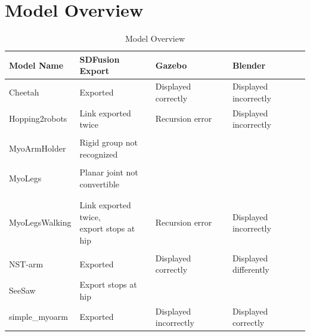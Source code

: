 \section{Model Overview}
\label{sec:over}
\begin{table}[h]
\hskip-4mm
\begin{tabular}{|l|l|l|l|}
\hline
\textbf{Model Name} & \textbf{SDFusion Export} & \textbf{Gazebo} & \textbf{Blender}\\ \hline
Cheetah & Exported & Displayed correctly & Displayed incorrectly\\\hline
Hopping2robots& Link exported twice& Recursion error & Displayed incorrectly\\\hline
&&&\\[-1em]
MyoArmHolder & \pbox{20cm}{Rigid group not\\recognized} & & \\ \hline
&&&\\[-1em]
MyoLegs & \pbox{20cm}{Planar joint not\\convertible} & & \\
&&&\\[-1em] \hline
&&&\\[-1em]
MyoLegsWalking& \pbox{20cm}{Link exported twice,\\export stops at hip} & Recursion error & Displayed incorrectly \\ \hline
&&&\\[-1em]
NST-arm &Exported& Displayed correctly&Displayed differently\\ \hline
SeeSaw& Export stops  at hip& & \\ \hline
simple\_myoarm& Exported & Displayed incorrectly & Displayed correctly\\ \hline
\end{tabular}
\caption[Model Overview]{Model Overview}
\label{tab:model}
\end{table}


